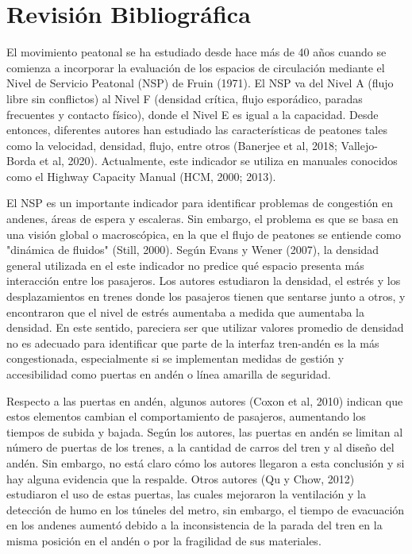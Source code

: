 \section{Revisión Bibliográfica}
\label{sec:2}

El movimiento peatonal se ha estudiado desde hace más de 40 años cuando se comienza a incorporar la evaluación de los espacios de circulación mediante el Nivel de Servicio Peatonal (NSP) de Fruin (1971). El NSP va del Nivel A (flujo libre sin conflictos) al Nivel F (densidad crítica, flujo esporádico, paradas frecuentes y contacto físico), donde el Nivel E es igual a la capacidad. Desde entonces, diferentes autores han estudiado las características de peatones tales como la velocidad, densidad, flujo, entre otros (Banerjee et al, 2018; Vallejo-Borda et al, 2020). Actualmente, este indicador se utiliza en manuales conocidos como el Highway Capacity Manual (HCM, 2000; 2013).

El NSP es un importante indicador para identificar problemas de congestión en andenes, áreas de espera y escaleras. Sin embargo, el problema es que se basa en una visión global o macroscópica, en la que el flujo de peatones se entiende como "dinámica de fluidos" (Still, 2000). Según Evans y Wener (2007), la densidad general utilizada en el este indicador no predice qué espacio presenta más interacción entre los pasajeros. Los autores estudiaron la densidad, el estrés y los desplazamientos en trenes donde los pasajeros tienen que sentarse junto a otros, y encontraron que el nivel de estrés aumentaba a medida que aumentaba la densidad. En este sentido, pareciera ser que utilizar valores promedio de densidad no es adecuado para identificar que parte de la interfaz tren-andén es la más congestionada, especialmente si se implementan medidas de gestión y accesibilidad como puertas en andén o línea amarilla de seguridad.

Respecto a las puertas en andén, algunos autores (Coxon et al, 2010) indican que estos elementos cambian el comportamiento de pasajeros, aumentando los tiempos de subida y bajada. Según los autores, las puertas en andén se limitan al número de puertas de los trenes, a la cantidad de carros del tren y al diseño del andén. Sin embargo, no está claro cómo los autores llegaron a esta conclusión y si hay alguna evidencia que la respalde. Otros autores (Qu y Chow, 2012) estudiaron el uso de estas puertas, las cuales mejoraron la ventilación y la detección de humo en los túneles del metro, sin embargo, el tiempo de evacuación en los andenes aumentó debido a la inconsistencia de la parada del tren en la misma posición en el andén o por la fragilidad de sus materiales.

